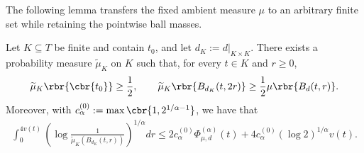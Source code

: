 \documentclass[11pt]{article}
\begin{document}
The following lemma transfers the fixed ambient measure $\mu$ to an
arbitrary finite set while retaining the pointwise ball masses.





\begin{lemma}
\label{lem:ambient_mass_finite_restriction}
Let $K\subseteq T$ be finite and contain $t_0$, and let
$d_K:=d|_{K\times K}$. There exists a probability measure
$\widetilde\mu_K$ on $K$ such that, for every $t\in K$ and $r\ge0$,
\begin{align*}
\widetilde\mu_K\rbr{\cbr{t_0}}
\ge\frac12,
\qquad
\widetilde\mu_K\rbr{B_{d_K}(t,2r)}
\ge\frac12\mu\rbr{B_d(t,r)}.
\end{align*}
Moreover, with $c_\alpha^{(0)}
:=
\max\cbr{1,2^{1/\alpha-1}}$, we have that
\begin{align*}
\int_0^{4v(t)}
\left(
\log\frac{1}{\widetilde\mu_K(B_{d_K}(t,r))}
\right)^{1/\alpha}dr\le
2c_\alpha^{(0)}\Phi_{\mu,d}^{(\alpha)}(t)
+4c_\alpha^{(0)}(\log2)^{1/\alpha}v(t).
\end{align*}
\end{lemma}
\end{document}
